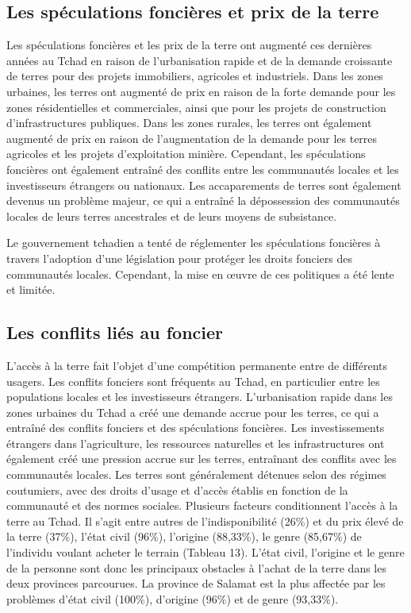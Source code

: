 \documentclass[12pt,oneside]{report}
\begin{document}
\subsection{Les spéculations foncières et prix de la terre}
Les spéculations foncières et les prix de la terre ont augmenté ces dernières années au Tchad en raison de l'urbanisation rapide et de la demande croissante de terres pour des projets immobiliers, agricoles et industriels. Dans les zones urbaines, les terres ont augmenté de prix en raison de la forte demande pour les zones résidentielles et commerciales, ainsi que pour les projets de construction d'infrastructures publiques. Dans les zones rurales, les terres ont également augmenté de prix en raison de l'augmentation de la demande pour les terres agricoles et les projets d'exploitation minière. Cependant, les spéculations foncières ont également entraîné des conflits entre les communautés locales et les investisseurs étrangers ou nationaux. Les accaparements de terres sont également devenus un problème majeur, ce qui a entraîné la dépossession des communautés locales de leurs terres ancestrales et de leurs moyens de subsistance.

Le gouvernement tchadien a tenté de réglementer les spéculations foncières à travers l'adoption d'une législation pour protéger les droits fonciers des communautés locales. Cependant, la mise en œuvre de ces politiques a été lente et limitée.

\subsection{Les conflits liés au foncier}
L’accès à la terre fait l’objet d’une compétition permanente entre de différents usagers. Les conflits fonciers sont fréquents au Tchad, en particulier entre les populations locales et les investisseurs étrangers. L'urbanisation rapide dans les zones urbaines du Tchad a créé une demande accrue pour les terres, ce qui a entraîné des conflits fonciers et des spéculations foncières. Les investissements étrangers dans l'agriculture, les ressources naturelles et les infrastructures ont également créé une pression accrue sur les terres, entraînant des conflits avec les communautés locales. Les terres sont généralement détenues selon des régimes coutumiers, avec des droits d'usage et d'accès établis en fonction de la communauté et des normes sociales. Plusieurs facteurs conditionnent l’accès à la terre au Tchad. Il s’agit entre autres de l’indisponibilité (26\%) et du prix élevé de la terre (37\%), l’état civil (96\%), l’origine (88,33\%), le genre (85,67\%) de l’individu voulant acheter le terrain (Tableau 13). L’état civil, l’origine et le genre de la personne sont donc les principaux obstacles à l’achat de la terre dans les deux provinces parcourues. La province de Salamat est la plus affectée par les problèmes d’état civil (100\%), d’origine (96\%) et de genre (93,33\%).
\end{document}
